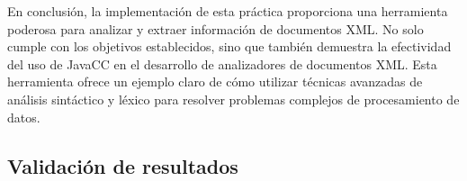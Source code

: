 En conclusión, la implementación de esta práctica proporciona una herramienta poderosa para analizar y extraer información de documentos XML. No solo cumple con los objetivos establecidos, sino que también demuestra la efectividad del uso de JavaCC en el desarrollo de analizadores de documentos XML. Esta herramienta ofrece un ejemplo claro de cómo utilizar técnicas avanzadas de análisis sintáctico y léxico para resolver problemas complejos de procesamiento de datos.







\subsection{Validación de resultados}

